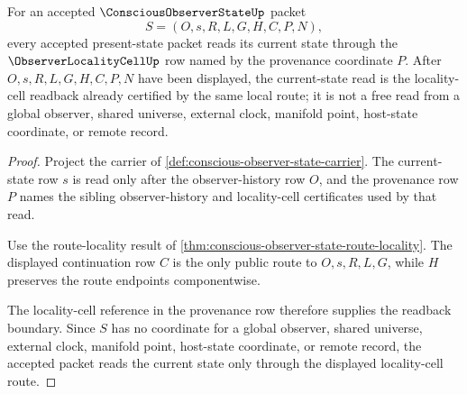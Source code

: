 \begin{theorem}
\label{thm:conscious-observer-state-locality-cell-readback}
For an accepted $\ConsciousObserverStateUp$ packet
$$
S=(O,s,R,L,G,H,C,P,N),
$$
every accepted present-state packet reads its current state through the $\ObserverLocalityCellUp$ row named by the provenance coordinate $P$. After $O,s,R,L,G,H,C,P,N$ have been displayed, the current-state read is the locality-cell readback already certified by the same local route; it is not a free read from a global observer, shared universe, external clock, manifold point, host-state coordinate, or remote record.
\end{theorem}
\begin{proof}
Project the carrier of \autoref{def:conscious-observer-state-carrier}. The current-state row $s$ is read only after the observer-history row $O$, and the provenance row $P$ names the sibling observer-history and locality-cell certificates used by that read.

Use the route-locality result of \autoref{thm:conscious-observer-state-route-locality}. The displayed continuation row $C$ is the only public route to $O,s,R,L,G$, while $H$ preserves the route endpoints componentwise.

The locality-cell reference in the provenance row therefore supplies the readback boundary. Since $S$ has no coordinate for a global observer, shared universe, external clock, manifold point, host-state coordinate, or remote record, the accepted packet reads the current state only through the displayed locality-cell route.
\end{proof}

